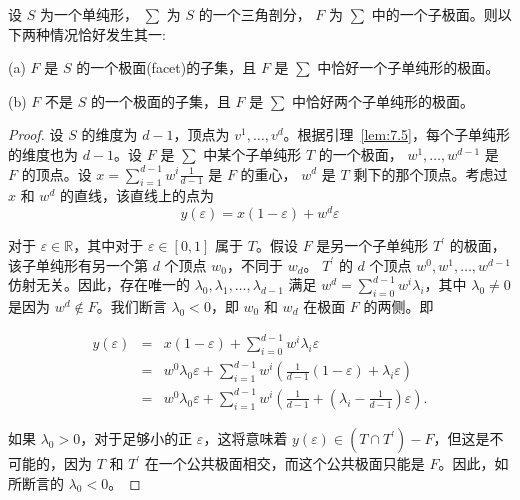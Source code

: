 \begin{lemma}\label{lem:7.6}
设 \(S\) 为一个单纯形， \(\sum\) 为 \(S\) 的一个三角剖分， \(F\) 为 \(\sum\) 中的一个子极面。则以下两种情况恰好发生其一:

(a) \(F\) 是 \(S\) 的一个极面(facet)的子集，且 \(F\) 是 \(\sum\) 中恰好一个子单纯形的极面。

(b) \(F\) 不是 \(S\) 的一个极面的子集，且 \(F\) 是 \(\sum\) 中恰好两个子单纯形的极面。
\end{lemma}


\begin{proof}
设 \(S\) 的维度为 \(d - 1\)，顶点为 \({v}^{1},\ldots,{v}^{d}\)。根据引理~\ref{lem:7.5}，每个子单纯形的维度也为 \(d - 1\)。设 \(F\) 是 \(\sum\) 中某个子单纯形 \(T\) 的一个极面， \({w}^{1},\ldots,{w}^{d - 1}\) 是 \(F\) 的顶点。设 \(x = \mathop{\sum }\limits_{{i = 1}}^{{d - 1}}{w}^{i}\frac{1}{d - 1}\) 是 \(F\) 的重心， \({w}^{d}\) 是 \(T\) 剩下的那个顶点。考虑过 \(x\) 和 \({w}^{d}\) 的直线，该直线上的点为
\[
y\left( \varepsilon \right)  = x\left( {1 - \varepsilon }\right)  + {w}^{d}\varepsilon
\]

对于 \(\varepsilon  \in  \mathbb{R}\)，其中对于 \(\varepsilon  \in  \left\lbrack  {0,1}\right\rbrack\) 属于 \(T\)。假设 \(F\) 是另一个子单纯形 \({T}^{\prime }\) 的极面，该子单纯形有另一个第 \(d\) 个顶点 \({w}_{0}\)，不同于 \({w}_{d}\)。 \({T}^{\prime }\) 的 \(d\) 个顶点 \({w}^{0},{w}^{1},\ldots,{w}^{d - 1}\) 仿射无关。因此，存在唯一的 \({\lambda }_{0},{\lambda }_{1},\ldots,{\lambda }_{d - 1}\) 满足 \({w}^{d} = \mathop{\sum }\limits_{{i = 0}}^{{d - 1}}{w}^{i}{\lambda }_{i}\)，其中 \({\lambda }_{0} \neq  0\) 是因为 \({w}^{d} \notin  F\)。我们断言 \({\lambda }_{0} < 0\)，即 \({w}_{0}\) 和 \({w}_{d}\) 在极面 \(F\) 的两侧。即

\begin{eqnarray}
y\left( \varepsilon \right) & =& x\left( {1 - \varepsilon }\right)  + \mathop{\sum }\limits_{{i = 0}}^{{d - 1}}{w}^{i}{\lambda }_{i}\varepsilon\nonumber\\
&=& {w}^{0}{\lambda }_{0}\varepsilon  + \mathop{\sum }\limits_{{i = 1}}^{{d - 1}}{w}^{i}\left( {\frac{1}{d - 1}\left( {1 - \varepsilon }\right)  + {\lambda }_{i}\varepsilon }\right)\nonumber\\
&=& {w}^{0}{\lambda }_{0}\varepsilon  + \mathop{\sum }\limits_{{i = 1}}^{{d - 1}}{w}^{i}\left( {\frac{1}{d - 1} + \left( {{\lambda }_{i} - \frac{1}{d - 1}}\right) \varepsilon }\right) .\label{eq:7.10}
\end{eqnarray}

如果 \({\lambda }_{0} > 0\)，对于足够小的正 \(\varepsilon\)，这将意味着 \(y\left( \varepsilon \right)  \in  \left( {T \cap  {T}^{\prime }}\right)  - F\)，但这是不可能的，因为 \(T\) 和 \({T}^{\prime }\) 在一个公共极面相交，而这个公共极面只能是 \(F\)。因此，如所断言的 \({\lambda }_{0} < 0\)。


\end{proof}
